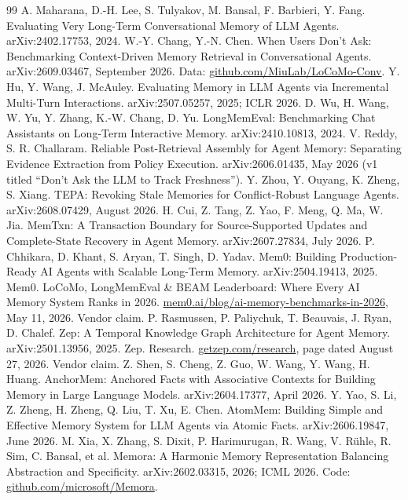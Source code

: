 \documentclass[11pt]{article}
\begin{document}
\begin{thebibliography}{99}
 A. Maharana, D.-H. Lee, S. Tulyakov, M. Bansal, F. Barbieri, Y. Fang.
  Evaluating Very Long-Term Conversational Memory of LLM Agents. arXiv:2402.17753, 2024.
 W.-Y. Chang, Y.-N. Chen. When Users Don't Ask: Benchmarking
  Context-Driven Memory Retrieval in Conversational Agents. arXiv:2609.03467, September 2026.
  Data: \url{github.com/MiuLab/LoCoMo-Conv}.
 Y. Hu, Y. Wang, J. McAuley. Evaluating Memory in LLM Agents via
  Incremental Multi-Turn Interactions. arXiv:2507.05257, 2025; ICLR 2026.
 D. Wu, H. Wang, W. Yu, Y. Zhang, K.-W. Chang, D. Yu. LongMemEval:
  Benchmarking Chat Assistants on Long-Term Interactive Memory. arXiv:2410.10813, 2024.
 V. Reddy, S. R. Challaram. Reliable Post-Retrieval Assembly for Agent
  Memory: Separating Evidence Extraction from Policy Execution. arXiv:2606.01435, May 2026
  (v1 titled ``Don't Ask the LLM to Track Freshness'').
 Y. Zhou, Y. Ouyang, K. Zheng, S. Xiang. TEPA: Revoking Stale Memories for
  Conflict-Robust Language Agents. arXiv:2608.07429, August 2026.
 H. Cui, Z. Tang, Z. Yao, F. Meng, Q. Ma, W. Jia. MemTxn: A Transaction
  Boundary for Source-Supported Updates and Complete-State Recovery in Agent Memory.
  arXiv:2607.27834, July 2026.
 P. Chhikara, D. Khant, S. Aryan, T. Singh, D. Yadav. Mem0: Building
  Production-Ready AI Agents with Scalable Long-Term Memory. arXiv:2504.19413, 2025.
 Mem0. LoCoMo, LongMemEval \& BEAM Leaderboard: Where Every AI Memory
  System Ranks in 2026. \url{mem0.ai/blog/ai-memory-benchmarks-in-2026}, May 11, 2026.
  Vendor claim.
 P. Rasmussen, P. Paliychuk, T. Beauvais, J. Ryan, D. Chalef. Zep: A
  Temporal Knowledge Graph Architecture for Agent Memory. arXiv:2501.13956, 2025.
 Zep. Research. \url{getzep.com/research}, page dated August 27,
  2026. Vendor claim.
 Z. Shen, S. Cheng, Z. Guo, W. Wang, Y. Wang, H. Huang. AnchorMem:
  Anchored Facts with Associative Contexts for Building Memory in Large Language Models.
  arXiv:2604.17377, April 2026.
 Y. Yao, S. Li, Z. Zheng, H. Zheng, Q. Liu, T. Xu, E. Chen. AtomMem:
  Building Simple and Effective Memory System for LLM Agents via Atomic Facts.
  arXiv:2606.19847, June 2026.
 M. Xia, X. Zhang, S. Dixit, P. Harimurugan, R. Wang, V. R\"uhle, R. Sim,
  C. Bansal, et al. Memora: A Harmonic Memory Representation Balancing Abstraction and
  Specificity. arXiv:2602.03315, 2026; ICML 2026. Code: \url{github.com/microsoft/Memora}.

\end{thebibliography}
\end{document}
